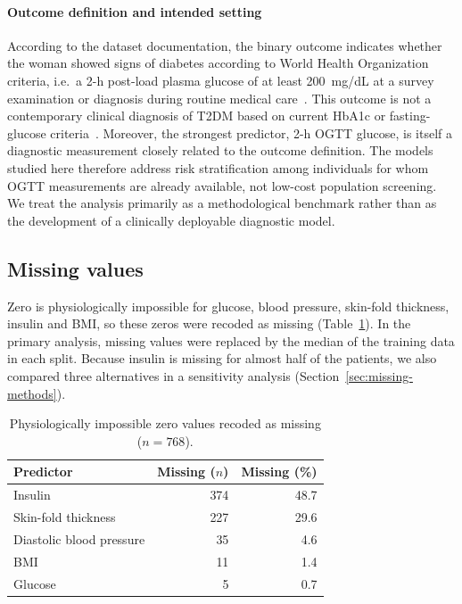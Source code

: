 \documentclass[preprint,12pt,authoryear=false]{elsarticle}
\begin{document}
\paragraph{Outcome definition and intended setting} According to the dataset documentation, the binary outcome indicates whether the woman showed signs of diabetes according to World Health Organization criteria, i.e.\ a 2-h post-load plasma glucose of at least 200~mg/dL at a survey examination or diagnosis during routine medical care~\cite{pimadata,smith1988adap}. This outcome is not a contemporary clinical diagnosis of T2DM based on current HbA1c or fasting-glucose criteria~\cite{ada2024}. Moreover, the strongest predictor, 2-h OGTT glucose, is itself a diagnostic measurement closely related to the outcome definition. The models studied here therefore address risk stratification among individuals for whom OGTT measurements are already available, not low-cost population screening. We treat the analysis primarily as a methodological benchmark rather than as the development of a clinically deployable diagnostic model.

\subsection{Missing values}
Zero is physiologically impossible for glucose, blood pressure, skin-fold thickness, insulin and BMI, so these zeros were recoded as missing (Table~\ref{tab:missing-counts}). In the primary analysis, missing values were replaced by the median of the training data in each split. Because insulin is missing for almost half of the patients, we also compared three alternatives in a sensitivity analysis (Section~\ref{sec:missing-methods}).

\begin{table}[!htbp]
\centering
\caption{Physiologically impossible zero values recoded as missing ($n = 768$).}
\label{tab:missing-counts}
\begin{tabular}{lrr}
\toprule
Predictor & Missing ($n$) & Missing (\%) \\
\midrule
Insulin & 374 & 48.7 \\
Skin-fold thickness & 227 & 29.6 \\
Diastolic blood pressure & 35 & 4.6 \\
BMI & 11 & 1.4 \\
Glucose & 5 & 0.7 \\
\bottomrule
\end{tabular}
\end{table}
\end{document}
